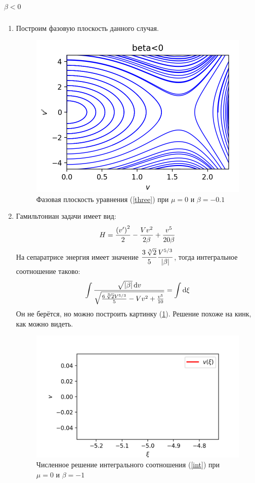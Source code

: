 \documentclass[titlepage]{article}
\begin{document}
\subparagraph{$\beta < 0$}
\begin{enumerate}
 \item Построим фазовую плоскость данного случая.
\begin{figure}[h]
 \includegraphics[width = 160 mm]{0+.png}
 \caption{Фазовая плоскость уравнения (\ref{three}) при $\mu=0$ и $\beta=-0.1$}
\end{figure}
\item Гамильтониан задачи имеет вид:
\begin{equation}
 H = \frac{\qty(v')^2}{2} - \frac{V v^2}{2\beta} + \frac{v^5}{20\beta} 
\end{equation}
На сепаратрисе энергия имеет значение $\dfrac{3\,\sqrt[3]{2}}{5}\dfrac{V^{5/3}}{\abs{\beta}}$, тогда интегральное соотношение таково:
\begin{equation}\label{int}
\int \dfrac{\sqrt{\abs{\beta}}\dd{v}}{\sqrt{\frac{6\,\sqrt[3]{2}V^{5/3}}{5}-Vv^2+\frac{v^5}{10}}} = \int \dd{\xi}
\end{equation}
Он не берётся, но можно построить картинку (\ref{pic}). Решение похоже на кинк, как можно видеть.
\begin{figure}[h]
 \includegraphics[width = 160 mm]{b0-.png}
 \caption{Численное решение интегрального соотношения (\ref{int}) при $\mu = 0$ и $\beta = -1$}
 \label{pic}
\end{figure}

\end{enumerate}
\end{document}
